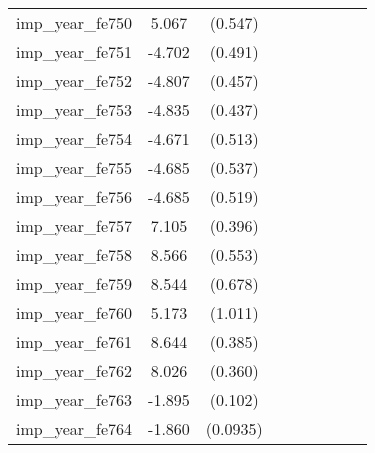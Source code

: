 {\begin{tabular}{l*{4}{cc}}
imp\_year\_fe750&    5.067\sym{***}&  (0.547)&                  &         &                  &         &                  &         \\
imp\_year\_fe751&   -4.702\sym{***}&  (0.491)&                  &         &                  &         &                  &         \\
imp\_year\_fe752&   -4.807\sym{***}&  (0.457)&                  &         &                  &         &                  &         \\
imp\_year\_fe753&   -4.835\sym{***}&  (0.437)&                  &         &                  &         &                  &         \\
imp\_year\_fe754&   -4.671\sym{***}&  (0.513)&                  &         &                  &         &                  &         \\
imp\_year\_fe755&   -4.685\sym{***}&  (0.537)&                  &         &                  &         &                  &         \\
imp\_year\_fe756&   -4.685\sym{***}&  (0.519)&                  &         &                  &         &                  &         \\
imp\_year\_fe757&    7.105\sym{***}&  (0.396)&                  &         &                  &         &                  &         \\
imp\_year\_fe758&    8.566\sym{***}&  (0.553)&                  &         &                  &         &                  &         \\
imp\_year\_fe759&    8.544\sym{***}&  (0.678)&                  &         &                  &         &                  &         \\
imp\_year\_fe760&    5.173\sym{***}&  (1.011)&                  &         &                  &         &                  &         \\
imp\_year\_fe761&    8.644\sym{***}&  (0.385)&                  &         &                  &         &                  &         \\
imp\_year\_fe762&    8.026\sym{***}&  (0.360)&                  &         &                  &         &                  &         \\
imp\_year\_fe763&   -1.895\sym{***}&  (0.102)&                  &         &                  &         &                  &         \\
imp\_year\_fe764&   -1.860\sym{***}& (0.0935)&                  &         &                  &         &                  &         \\

\end{tabular}}
